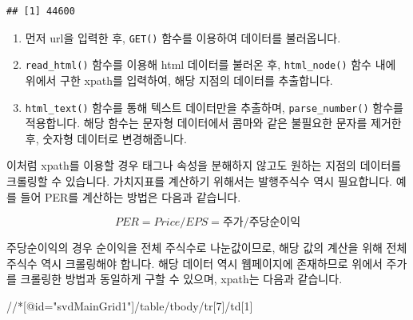 \documentclass[]{book}
\newenvironment{Shaded}{\begin{snugshade}}{\end{snugshade}}
\newcommand{\DataTypeTok}[1]{\textcolor[rgb]{0.13,0.29,0.53}{#1}}
\newcommand{\KeywordTok}[1]{\textcolor[rgb]{0.13,0.29,0.53}{\textbf{#1}}}
\newcommand{\NormalTok}[1]{#1}
\newcommand{\OperatorTok}[1]{\textcolor[rgb]{0.81,0.36,0.00}{\textbf{#1}}}
\newcommand{\StringTok}[1]{\textcolor[rgb]{0.31,0.60,0.02}{#1}}
\providecommand{\tightlist}{%
  \setlength{\itemsep}{0pt}\setlength{\parskip}{0pt}}
\begin{document}
\begin{Shaded}
\end{Shaded}

\begin{verbatim}
## [1] 44600
\end{verbatim}

\begin{enumerate}
\def\labelenumi{\arabic{enumi}.}
\tightlist
\item
  먼저 url을 입력한 후, \texttt{GET()} 함수를 이용하여 데이터를 불러옵니다.
\item
  \texttt{read\_html()} 함수를 이용해 html 데이터를 불러온 후, \texttt{html\_node()} 함수 내에 위에서 구한 xpath를 입력하여, 해당 지점의 데이터를 추출합니다.
\item
  \texttt{html\_text()} 함수를 통해 텍스트 데이터만을 추출하며, \texttt{parse\_number()} 함수를 적용합니다. 해당 함수는 문자형 데이터에서 콤마와 같은 불필요한 문자를 제거한 후, 숫자형 데이터로 변경해줍니다.
\end{enumerate}

이처럼 xpath를 이용할 경우 태그나 속성을 분해하지 않고도 원하는 지점의 데이터를 크롤링할 수 있습니다. 가치지표를 계산하기 위해서는 발행주식수 역시 필요합니다. 예를 들어 PER를 계산하는 방법은 다음과 같습니다.

\[ PER = Price / EPS  = 주가 / 주당순이익\]

주당순이익의 경우 순이익을 전체 주식수로 나눈값이므로, 해당 값의 계산을 위해 전체 주식수 역시 크롤링해야 합니다. 해당 데이터 역시 웹페이지에 존재하므로 위에서 주가를 크롤링한 방법과 동일하게 구할 수 있으며, xpath는 다음과 같습니다.

\begin{Shaded}
\begin{Highlighting}[]
\NormalTok{//*[@id="svdMainGrid1"]/table/tbody/tr[7]/td[1]}
\end{Highlighting}
\end{Shaded}
\end{document}
